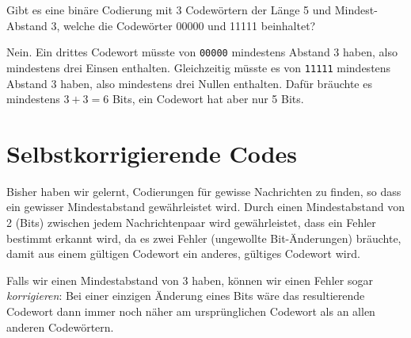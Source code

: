 \begin{mychallenge}
    Gibt es eine binäre Codierung mit 3 Codewörtern der Länge 5 und Mindest-Abstand 3, welche die Codewörter 00000 und 11111 beinhaltet?
    \begin{myanswer}
        Nein. Ein drittes Codewort müsste von \texttt{00000} mindestens Abstand 3 haben, also mindestens drei Einsen enthalten. Gleichzeitig müsste es von \texttt{11111} mindestens Abstand 3 haben, also mindestens drei Nullen enthalten. Dafür bräuchte es mindestens $3 + 3 = 6$ Bits, ein Codewort hat aber nur 5 Bits.
    \end{myanswer}
\end{mychallenge}



\section{Selbstkorrigierende Codes}

Bisher haben wir gelernt, Codierungen für gewisse Nachrichten zu finden, so dass ein gewisser Mindestabstand gewährleistet wird. Durch einen Mindestabstand von 2 (Bits) zwischen jedem Nachrichtenpaar wird gewährleistet, dass ein Fehler bestimmt erkannt wird, da es zwei Fehler (ungewollte Bit-Änderungen) bräuchte, damit aus einem gültigen Codewort ein anderes, gültiges Codewort wird.

Falls wir einen Mindestabstand von 3 haben, können wir einen Fehler sogar \textit{korrigieren}: Bei einer einzigen Änderung eines Bits wäre das resultierende Codewort dann immer noch näher am ursprünglichen Codewort als an allen anderen Codewörtern.

